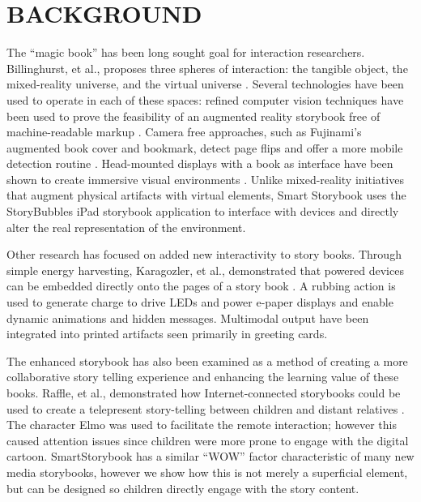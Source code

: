 \documentclass{sigchi}
\begin{document}
\section{BACKGROUND}
The ``magic book'' has been long sought goal for interaction researchers.
Billinghurst, et al., proposes three spheres of interaction: the tangible object, the mixed-reality universe, and the virtual universe \cite{billinghurst_magicbook-moving_2001}. Several technologies have been used to operate in each of these spaces: refined computer vision techniques have been used to prove the feasibility of an augmented reality storybook free of machine-readable markup \cite{scherrer_haunted_2008}. Camera free approaches, such as Fujinami's augmented book cover and bookmark, detect page flips and offer a more mobile detection routine \cite{fujinami_page-flipping_2009}. Head-mounted displays with a book as interface have been shown to create immersive visual environments \cite{saso_little_2003}. Unlike mixed-reality initiatives that augment physical artifacts with virtual elements, Smart Storybook uses the StoryBubbles iPad storybook application to interface with devices and directly alter the real representation of the environment.

Other research has focused on added new interactivity to story books. 
Through simple energy harvesting, Karagozler, et al., demonstrated that powered devices can be embedded directly onto the pages of a story book \cite{karagozler_paper_2013}. A rubbing action is used to generate charge to drive LEDs and power e-paper displays and enable dynamic animations and hidden messages. 
Multimodal output have been integrated into printed artifacts \cite{iggulden_printed_1999} seen primarily in greeting cards. 

The enhanced storybook has also been examined as a method of creating a more collaborative story telling experience and enhancing the learning value of these books. Raffle, et al., demonstrated how Internet-connected storybooks could be used to create a telepresent story-telling between children and distant relatives \cite{raffle_family_2010}. The character Elmo was used to facilitate the remote interaction; however this caused attention issues since children were more prone to engage with the digital cartoon. SmartStorybook has a similar ``WOW'' factor characteristic of many new media storybooks, however we show how this is not merely a superficial element, but can be designed so children directly engage with the story content. 


\end{document}
